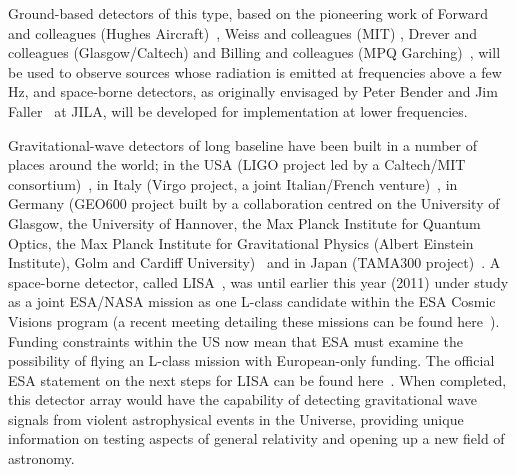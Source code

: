 Ground-based detectors of this type, based on the pioneering work of Forward
and colleagues (Hughes Aircraft)~\cite{Forward}, Weiss and colleagues (MIT)
\cite{Weiss}, Drever and colleagues (Glasgow/Caltech) \cite{Drever1,
Drever2} and Billing and colleagues (MPQ Garching)~\cite{Billing}, will be
used to observe sources whose radiation is emitted at frequencies above a few
Hz, and space-borne detectors, as originally envisaged by Peter Bender and Jim
Faller~\cite{BenderFaller1, BenderFaller2} at JILA, will be developed for
implementation at lower frequencies.


Gravitational-wave detectors of long baseline have been built in a number of
places around the world; in the USA (LIGO project led by a Caltech/MIT
consortium)~\cite{LIGOS5, LIGOweb}, in Italy (Virgo project, a joint
Italian/French venture)~\cite{Acernese:2007, VIRGOweb}, in Germany (GEO600
project built by a collaboration centred on the University of Glasgow, the
University of Hannover, the Max Planck Institute for Quantum Optics, the Max
Planck Institute for Gravitational Physics (Albert Einstein Institute), Golm and
Cardiff University)~\cite{Willke:2007, GEOweb} and in Japan (TAMA300
project)~\cite{TAMAStatus, TAMAweb}. A space-borne detector, called
LISA~\cite{LISA, NASAweb, ESAweb}, was until earlier this year (2011)
under study as a joint ESA/NASA mission as one L-class candidate
within the ESA Cosmic Visions program (a recent meeting detailing
these missions can be found here~\cite{ESACosmicVisions}). Funding
constraints within the US now mean that ESA must examine the
possibility of flying an L-class mission with European-only
funding. The official ESA statement on the next steps for LISA can be
found here~\cite{LISAESAstatement}. When completed, this detector
array would have the capability of detecting gravitational wave
signals from violent astrophysical events in the Universe, providing
unique information on testing aspects of general relativity and
opening up a new field of astronomy.


